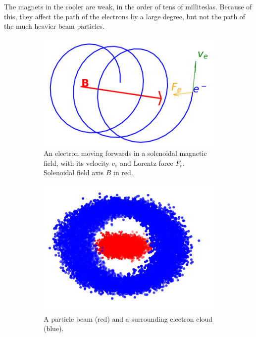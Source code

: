 The magnets in the cooler are weak, in the order of tens of milliteslas.
Because of this, they affect the path of the electrons by a large degree, but
not the path of the much heavier beam particles.

\begin{figure}
    \centering
    \begin{subfigure}[b]{0.4\linewidth}
        \centering
        \includegraphics[width=0.9\linewidth]{figs/epath}
        \caption{An electron moving forwards in a solenoidal magnetic field,
        with its velocity $v_e$ and Lorentz force $F_e$. Solenoidal field axis $B$ in red.}
        \label{fig:epath}
    \end{subfigure}
    \hfill
    \begin{subfigure}[b]{0.4\linewidth}
        \centering
        \includegraphics[width=0.9\linewidth]{figs/ecloud}
        \caption{A particle beam (red) and a
        surrounding electron cloud (blue).}
        \label{fig:ecloud}
    \end{subfigure}
    \caption{}
\end{figure}

